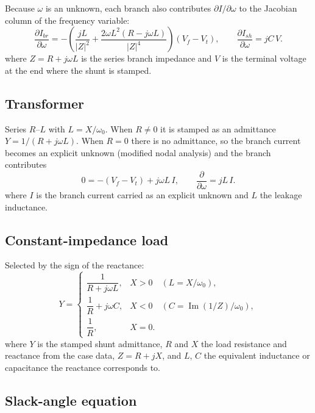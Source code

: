 \documentclass[11pt]{article}
\newcommand{\wnom}{\omega_0}
\begin{document}
Because $\omega$ is an unknown, each branch also contributes
$\partial I/\partial\omega$ to the Jacobian column of the frequency
variable:
\begin{equation}
  \frac{\partial I_{br}}{\partial \omega}
  = -\left(\frac{jL}{|Z|^2} + \frac{2\omega L^2 (R - j\omega L)}{|Z|^4}\right)(V_f - V_t),
  \qquad
  \frac{\partial I_{sh}}{\partial \omega} = jC\,V .
\end{equation}
where $Z = R + j\omega L$ is the series branch impedance and $V$ is the
terminal voltage at the end where the shunt is stamped.

\subsection{Transformer}

Series $R$--$L$ with $L = X/\wnom$. When $R\neq 0$ it is stamped as an
admittance $Y=1/(R+j\omega L)$. When $R=0$ there is no admittance, so the
branch current becomes an explicit unknown (modified nodal analysis) and
the branch contributes
\begin{equation}
  0 = -(V_f - V_t) + j\omega L\, I, \qquad
  \frac{\partial}{\partial\omega} = jL\,I .
\end{equation}
where $I$ is the branch current carried as an explicit unknown and $L$ the
leakage inductance.

\subsection{Constant-impedance load}

Selected by the sign of the reactance:
\begin{equation}
  Y =
  \begin{cases}
    \dfrac{1}{R + j\omega L}, & X > 0 \quad (L = X/\wnom), \\[2ex]
    \dfrac{1}{R} + j\omega C, & X < 0 \quad (C = \operatorname{Im}(1/Z)/\wnom), \\[2ex]
    \dfrac{1}{R}, & X = 0 .
  \end{cases}
\end{equation}
where $Y$ is the stamped shunt admittance, $R$ and $X$ the load resistance
and reactance from the case data, $Z = R + jX$, and $L$, $C$ the equivalent
inductance or capacitance the reactance corresponds to.

\subsection{Slack-angle equation}
\end{document}
